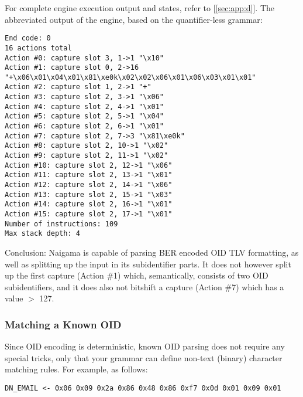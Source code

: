 
For complete engine execution output and states, refer to [\ref{sec:app:d}].
The abbreviated output of the engine, based on the quantifier-less grammar:

\begin{changemargin}{-60mm}{0mm} 
\begin{myquote}
\begin{verbatim}
End code: 0
16 actions total
Action #0: capture slot 3, 1->1 "\x10"
Action #1: capture slot 0, 2->16 
"+\x06\x01\x04\x01\x81\xe0k\x02\x02\x06\x01\x06\x03\x01\x01"
Action #2: capture slot 1, 2->1 "+"
Action #3: capture slot 2, 3->1 "\x06"
Action #4: capture slot 2, 4->1 "\x01"
Action #5: capture slot 2, 5->1 "\x04"
Action #6: capture slot 2, 6->1 "\x01"
Action #7: capture slot 2, 7->3 "\x81\xe0k"
Action #8: capture slot 2, 10->1 "\x02"
Action #9: capture slot 2, 11->1 "\x02"
Action #10: capture slot 2, 12->1 "\x06"
Action #11: capture slot 2, 13->1 "\x01"
Action #12: capture slot 2, 14->1 "\x06"
Action #13: capture slot 2, 15->1 "\x03"
Action #14: capture slot 2, 16->1 "\x01"
Action #15: capture slot 2, 17->1 "\x01"
Number of instructions: 109
Max stack depth: 4
\end{verbatim}
\end{myquote}
\end{changemargin}

Conclusion: Naigama is capable of parsing BER encoded OID TLV formatting, 
as well as splitting up the input in its subidentifier parts. It does not 
however split up the first capture (Action \#1) which, semantically, 
consists of two OID subidentifiers, and it does also not bitshift a 
capture (Action \#7) which has a value $>$ 127.

\subsubsection{Matching a Known OID}
\label{sec:work:oids:known}

Since OID encoding is deterministic, known OID parsing does not require 
any special tricks, only that your grammar can define non-text (binary) 
character matching rules. For example, as follows:

\begin{changemargin}{-60mm}{0mm}
\begin{myquote}
\begin{verbatim}
DN_EMAIL <- 0x06 0x09 0x2a 0x86 0x48 0x86 0xf7 0x0d 0x01 0x09 0x01
\end{verbatim}
\end{myquote}
\end{changemargin}


